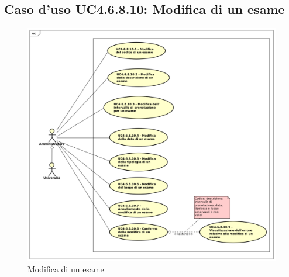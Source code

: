 \subsection{Caso d'uso \texorpdfstring{UC4.6.8.10}{UC4.6.8.10}: Modifica di un esame}
\begin{figure} [H]
	\centering
	\includegraphics[scale=0.45]{./img/UC4-6-8-10.pdf}
	\caption{Modifica di un esame}\label{}
\end{figure}
